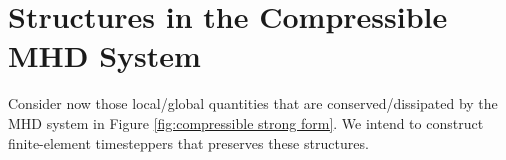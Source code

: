 \section{Structures in the Compressible MHD System}\label{cha:structures}
    Consider now those local/global quantities that are conserved/dissipated by the MHD system in Figure \ref{fig:compressible strong form}. We intend to construct finite-element timesteppers that preserves these structures.


    
    
    